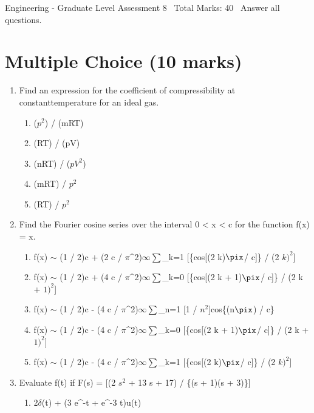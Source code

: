 \documentclass[12pt]{article}
\begin{document}
\begin{center}
Engineering - Graduate Level Assessment 8 \
Total Marks: 40 \
Answer all questions.
\end{center}

\section*{Multiple Choice (10 marks)}
\begin{enumerate}[label=\arabic*.]
\item Find an expression for the coefficient of compressibility at constanttemperature for an ideal gas.
\begin{enumerate}[label=(\alph*)]
    \item ($p^2$) / (mRT)
    \item (RT) / (pV)
    \item (nRT) / ($pV^2$)
    \item (mRT) / $p^2$
    \item (RT) / $p^2$
\end{enumerate}
\item Find the Fourier cosine series over the interval 0 \textless{} x \textless{} c for the function f(x) = x.
\begin{enumerate}[label=(\alph*)]
    \item f(x) \ensuremath{\sim} (1 / 2)c + (2 c / \ensuremath{\pi}^2)\ensuremath{\infty}\ensuremath{\sum}\_k=1 [\{cos[(2 k)\ensuremath{\pix}/ c]\} / (2 $k)^2$]
    \item f(x) \ensuremath{\sim} (1 / 2)c + (4 c / \ensuremath{\pi}^2)\ensuremath{\infty}\ensuremath{\sum}\_k=0 [\{cos[(2 k + 1)\ensuremath{\pix}/ c]\} / (2 k + $1)^2$]
    \item f(x) \ensuremath{\sim} (1 / 2)c - (4 c / \ensuremath{\pi}^2)\ensuremath{\infty}\ensuremath{\sum}\_n=1 [1 / $n^2$]cos\{(n\ensuremath{\pix}) / c\}
    \item f(x) \ensuremath{\sim} (1 / 2)c - (4 c / \ensuremath{\pi}^2)\ensuremath{\infty}\ensuremath{\sum}\_k=0 [\{cos[(2 k + 1)\ensuremath{\pix}/ c]\} / (2 k + $1)^2$]
    \item f(x) \ensuremath{\sim} (1 / 2)c - (4 c / \ensuremath{\pi}^2)\ensuremath{\infty}\ensuremath{\sum}\_k=1 [\{cos[(2 k)\ensuremath{\pix}/ c]\} / (2 $k)^2$]
\end{enumerate}
\item Evaluate f(t) if F(s) = [(2 $s^2$ + 13 s + 17) / \{(s + 1)(s + 3)\}]
\begin{enumerate}[label=(\alph*)]
    \item 2\ensuremath{\delta}(t) + (3 e^-t + e^-3 t)u(t)

\end{enumerate}
\end{enumerate}
\end{document}
